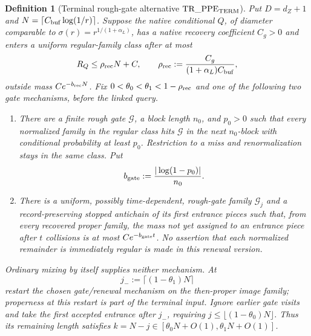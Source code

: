 \documentclass[11pt]{article}
\newtheorem{definition}[theorem]{Definition}
\begin{document}
\begin{definition}[Terminal rough-gate alternative
$\mathrm{TR\_PPE}_{\rm TERM}$]
\label{def:translation-ppe-terminal}
Put $D=d_Z+1$ and
$N=\lceil C_{\rm buf}\log(1/r)\rceil$.  Suppose the native conditional
$Q$, of diameter comparable to
$\sigma(r)=r^{1/(1+\alpha_L)}$, has a native recovery coefficient
$C_g>0$ and enters a uniform regular-family class after
at most
\begin{equation}
\label{eq:translation-terminal-recovery-fraction}
 R_Q\le \rho_{\rm rec}N+C,\qquad
 \rho_{\rm rec}:=\frac{C_g}{(1+\alpha_L)C_{\rm buf}},
\end{equation}
outside mass $Ce^{-b_{\rm rec}N}$.  Fix
$0<\theta_0<\theta_1<1-\rho_{\rm rec}$ and one of the following two gate
mechanisms, before the linked query.
\begin{enumerate}[label=\textup{(G\arabic*)}]
\item There are a finite rough gate $\mathcal G$, a block length $n_0$,
      and $p_0>0$ such that every normalized family in the regular class
      hits $\mathcal G$ in the next $n_0$-block with conditional probability
      at least $p_0$.  Restriction to a miss and renormalization stays in the
      same class.  Put
      \begin{equation}
      \label{eq:translation-terminal-gate-rate}
       b_{\rm gate}:=\frac{|\log(1-p_0)|}{n_0}.
      \end{equation}
\item There is a uniform, possibly time-dependent, rough-gate family
      $\mathcal G_j$ and a record-preserving stopped antichain of its first
      entrance pieces such that, from every recovered proper family, the
      mass not yet assigned to an entrance piece after $t$ collisions is at
      most $Ce^{-b_{\rm gate}t}$.  No assertion that each normalized
      remainder is immediately regular is made in this renewal version.
\end{enumerate}
Ordinary mixing by itself supplies neither mechanism.  At
\begin{equation}
\label{eq:translation-terminal-restart-time}
 j_-:=\lceil(1-\theta_1)N\rceil
\end{equation}
restart the chosen gate/renewal mechanism on the then-proper image family;
properness at this restart is part of the terminal input.  Ignore earlier
gate visits and take the first accepted entrance after $j_-$, requiring
$j\le\lfloor(1-\theta_0)N\rfloor$.  Thus its remaining length satisfies
$k=N-j\in[\theta_0N+O(1),\theta_1N+O(1)]$.


\end{definition}
\end{document}
